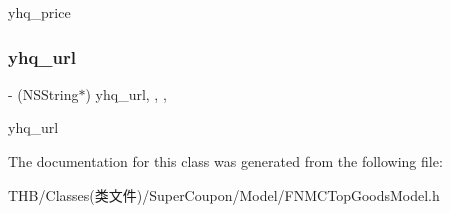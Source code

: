 yhq\+\_\+price \mbox{\label{interface_f_n_m_c_top_goods_model_a0d909365f25e39dd4d8f9ad0ea858751}} 
\subsubsection{\texorpdfstring{yhq\+\_\+url}{yhq\_url}}
{\footnotesize\ttfamily -\/ (N\+S\+String$\ast$) yhq\+\_\+url\hspace{0.3cm}{\ttfamily [read]}, {\ttfamily [write]}, {\ttfamily [nonatomic]}, {\ttfamily [copy]}}

yhq\+\_\+url 

The documentation for this class was generated from the following file\+:\begin{DoxyCompactItemize}
\item 
T\+H\+B/\+Classes(类文件)/\+Super\+Coupon/\+Model/F\+N\+M\+C\+Top\+Goods\+Model.\+h\end{DoxyCompactItemize}
